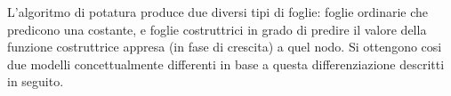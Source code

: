 L'algoritmo di potatura produce due diversi tipi di foglie: foglie ordinarie che predicono una costante, e foglie costruttrici in grado di predire il valore della funzione costruttrice appresa (in fase di crescita) a quel nodo.
Si ottengono cosi due modelli concettualmente differenti in base a questa differenziazione descritti in seguito.

